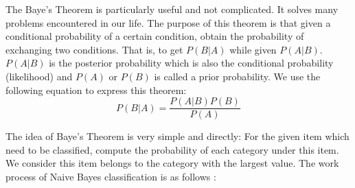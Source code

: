 \documentclass[sigconf]{acmart}
\begin{document}
The Baye's Theorem is particularly useful and not complicated. It solves many problems encountered in our life. The purpose of this theorem is that given a conditional probability of a certain condition, obtain the probability of exchanging two conditions. That is, to get $P(B|A)$ while given $P(A|B)$. $P(A|B)$ is the posterior probability which is also the conditional probability (likelihood) and $P(A)$ or $P(B)$ is called a prior probability. We use the following equation to express this theorem:
\[
    P(B|A)=\dfrac{P(A|B)P(B)}{P(A)}
\]

The idea of Baye's Theorem is very simple and directly: For the given item which need to be classified, compute the probability of each category under this item. We consider this item belongs to the category with the largest value. The work process of Naive Bayes classification is as follows \cite{wiki.nb}:
\end{document}
